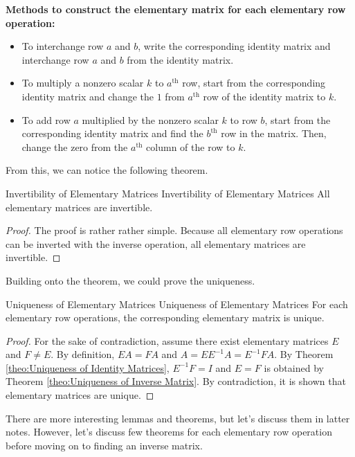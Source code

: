 \documentclass[../main.tex]{subfiles}
\begin{document}
\begin{definition}
\textbf{Methods to construct the elementary matrix for each
elementary row operation:}
\begin{itemize}[noitemsep]
\item
To interchange row $a$ and $b$, write the corresponding identity
matrix and interchange row $a$ and $b$ from the identity matrix.
\item
To multiply a nonzero scalar $k$ to $a^\text{th}$ row, start from the
corresponding identity matrix and change the $1$ from $a^\text{th}$
row of the identity matrix to $k$.
\item
To add row $a$ multiplied by the nonzero scalar $k$ to row $b$,
start from the corresponding identity matrix and find the
$b^\text{th}$ row in the matrix. Then, change the zero from the
$a^\text{th}$ column of the row to $k$.
\end{itemize}
\end{definition}

From this, we can notice the following theorem.

\begin{theorem}{Invertibility of Elementary Matrices}
{Invertibility of Elementary Matrices}
All elementary matrices are invertible.
\end{theorem}
\begin{proof}
The proof is rather rather simple. Because all elementary row
operations can be inverted with the inverse operation,
all elementary matrices are invertible.
\end{proof}

Building onto the theorem, we could prove the uniqueness.

\begin{theorem}{Uniqueness of Elementary Matrices}
{Uniqueness of Elementary Matrices}
For each elementary row operations, the corresponding elementary
matrix is unique.
\end{theorem}
\begin{proof}
For the sake of contradiction, assume there exist elementary
matrices $E$ and $F \neq E$. By definition, $EA = FA$ and
$A = EE^{-1}A = E^{-1}FA$. By Theorem \ref{theo:Uniqueness of Identity
Matrices}, $E^{-1}F = I$ and $E = F$ is obtained by Theorem
\ref{theo:Uniqueness of Inverse Matrix}. By contradiction, it is
shown that elementary matrices are unique.
\end{proof}

There are more interesting lemmas and theorems, but let's discuss
them in latter notes. However, let's discuss few theorems for each
elementary row operation before moving on to finding an inverse
matrix.
\end{document}
